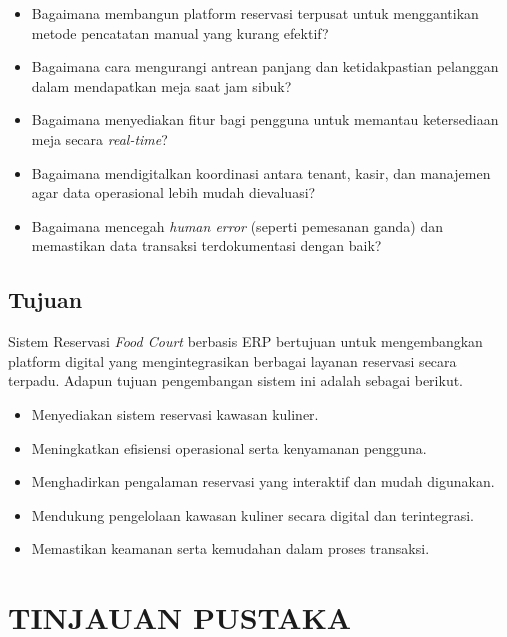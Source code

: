 \documentclass[conference]{IEEEtran}
\begin{document}
\begin{itemize}
    \item Bagaimana membangun platform reservasi terpusat untuk menggantikan metode pencatatan manual yang kurang efektif?
    
    \item Bagaimana cara mengurangi antrean panjang dan ketidakpastian pelanggan dalam mendapatkan meja saat jam sibuk?
    
    \item Bagaimana menyediakan fitur bagi pengguna untuk memantau ketersediaan meja secara \textit{real-time}?
    
    \item Bagaimana mendigitalkan koordinasi antara tenant, kasir, dan manajemen agar data operasional lebih mudah dievaluasi?
    
    \item Bagaimana mencegah \textit{human error} (seperti pemesanan ganda) dan memastikan data transaksi terdokumentasi dengan baik?
\end{itemize}

\subsection{Tujuan}
Sistem Reservasi \textit{Food Court} berbasis ERP bertujuan untuk mengembangkan platform digital yang mengintegrasikan berbagai layanan reservasi secara terpadu. Adapun tujuan pengembangan sistem ini adalah sebagai berikut.

\begin{itemize}
    \item Menyediakan sistem reservasi kawasan kuliner.
    
    \item Meningkatkan efisiensi operasional serta kenyamanan pengguna.
    
    \item Menghadirkan pengalaman reservasi yang interaktif dan mudah digunakan.
    
    \item Mendukung pengelolaan kawasan kuliner secara digital dan terintegrasi.
    
    \item Memastikan keamanan serta kemudahan dalam proses transaksi.
\end{itemize}

\section{TINJAUAN PUSTAKA}
\end{document}
